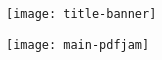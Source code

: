 \documentclass{article}
\begin{document}
\vspace*{-15pt}
\texttt{[image: title-banner]}

\vspace*{-10pt}\noindent
\texttt{[image: main-pdfjam]}

\vspace*{-300pt}
\end{document}
